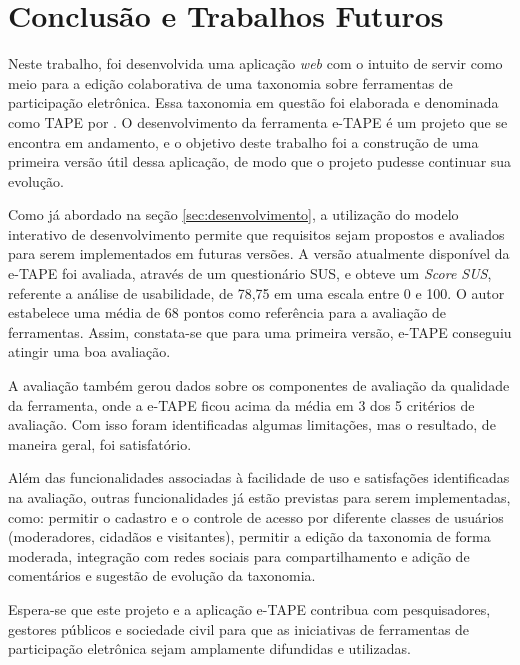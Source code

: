 \chapter[Conclusão e Trabalhos Futuros]{Conclusão e Trabalhos Futuros}
\label{cap:cap5}

Neste trabalho, foi desenvolvida uma aplicação \textit{web} com o intuito de servir como meio para a edição colaborativa de uma taxonomia
sobre ferramentas de participação eletrônica. Essa taxonomia em questão foi elaborada e denominada como TAPE por . 
O desenvolvimento da ferramenta e-TAPE é um projeto que se encontra em andamento, e o objetivo deste trabalho foi a construção de uma primeira versão útil dessa aplicação, 
de modo que o projeto pudesse continuar sua evolução.

\par
Como já abordado na seção \ref{sec:desenvolvimento}, a utilização do modelo interativo de desenvolvimento permite que requisitos sejam propostos e avaliados para serem
implementados em futuras versões. A versão atualmente disponível da e-TAPE foi avaliada, através de um questionário SUS, e obteve um \textit{Score SUS}, referente a análise de usabilidade,
de 78,75 em uma escala entre 0 e 100. O autor  estabelece uma média de 68 pontos como referência para a avaliação de ferramentas. 
Assim, constata-se que para uma primeira versão, e-TAPE conseguiu atingir uma boa avaliação. 

\par
A avaliação também gerou dados sobre os componentes de avaliação da qualidade da ferramenta, onde a e-TAPE ficou acima da média em 3 dos 5 critérios de avaliação. Com isso foram
identificadas algumas limitações, mas o resultado, de maneira geral, foi satisfatório. 

\par
Além das funcionalidades associadas à facilidade de uso e satisfações identificadas na avaliação, outras funcionalidades já estão previstas para serem implementadas, como: 
permitir o cadastro e o controle de acesso por diferente classes de usuários (moderadores, cidadãos e visitantes), permitir a edição da taxonomia de forma moderada, 
integração com redes sociais para compartilhamento e adição de comentários e sugestão de evolução da taxonomia. 


\par
Espera-se que este projeto e a aplicação e-TAPE contribua com pesquisadores, gestores públicos e sociedade civil para que as iniciativas de ferramentas de participação eletrônica
sejam amplamente difundidas e utilizadas. 

